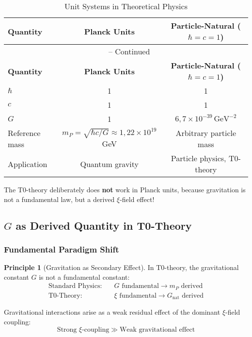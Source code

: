 \documentclass[12pt,a4paper]{article}
\theoremstyle{definition}
\newtheorem{principle}{Principle}
\begin{document}
\begin{longtable}{lcc}
	\caption{Unit Systems in Theoretical Physics} \\
	\toprule
	\textbf{Quantity} & \textbf{Planck Units} & \textbf{Particle-Natural ($\hbar = c = 1$)} \\
	\midrule
	\endfirsthead
	\multicolumn{3}{c}{\tablename\ \thetable{} -- Continued} \\
	\toprule
	\textbf{Quantity} & \textbf{Planck Units} & \textbf{Particle-Natural ($\hbar = c = 1$)} \\
	\midrule
	\endhead
	$\hbar$ & 1 & 1 \\
	$c$ & 1 & 1 \\
	$G$ & 1 & $6{,}7 \times 10^{-39} \, \text{GeV}^{-2}$ \\
	Reference mass & $m_P = \sqrt{\hbar c / G} \approx 1{,}22 \times 10^{19}$ GeV & Arbitrary particle mass \\
	Application & Quantum gravity & Particle physics, T0-theory \\
	\bottomrule
\end{longtable}

\begin{revolutionary}
	The T0-theory deliberately does \textbf{not} work in Planck units, because gravitation is not a fundamental law, but a derived $\xi$-field effect!
\end{revolutionary}

\subsection{$G$ as Derived Quantity in T0-Theory}

\subsubsection{Fundamental Paradigm Shift}

\begin{principle}[Gravitation as Secondary Effect]
	In T0-theory, the gravitational constant $G$ is not a fundamental constant:
	\begin{align}
		\text{Standard Physics:} \quad &G \text{ fundamental} \rightarrow m_P \text{ derived} \\
		\text{T0-Theory:} \quad &\xi \text{ fundamental} \rightarrow G_{\text{nat}} \text{ derived}
	\end{align}
\end{principle}

Gravitational interactions arise as a weak residual effect of the dominant $\xi$-field coupling:
\begin{equation}
	\text{Strong } \xi\text{-coupling} \gg \text{Weak gravitational effect}
\end{equation}
\end{document}
